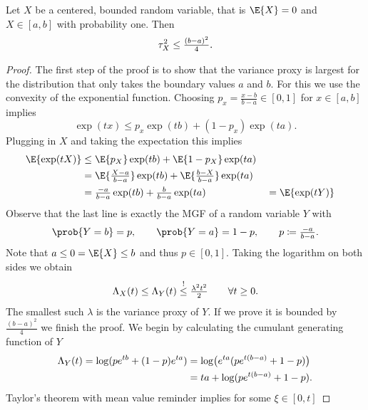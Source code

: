\begin{mdframed}[innertopmargin=0pt]
\begin{lemma}
    \label{lem: hoeffding's lemma}
    Let \(X\) be a centered, bounded random variable, that is 
    \(\E{X}=0\) and \(X\in [a,b]\) with probability one. Then
    \[
        \tau^2_{X} \le \tfrac{(b-a)^2}4.
    \]
\end{lemma}
\end{mdframed}
\begin{proof}
    The first step of the proof is to show that the variance proxy is largest
    for the distribution that only takes the boundary values \(a\) and \(b\).
    For this we use the convexity of the exponential function. 
    Choosing \(p_x=\frac{x-b}{b-a}\in [0,1]\) for \(x\in [a,b]\) implies
    \[
        \exp(t x) \le p_x \exp(t b) + (1-p_x) \exp(t a).
    \]
    Plugging in \(X\) and taking the expectation this implies
    \[\begin{aligned}
        \E{\exp(t X)}
        &\le \E{p_X} \exp(t b) + \E{1-p_X} \exp(t a)
        \\
        &= \E{\tfrac{X-a}{b-a}} \exp(t b) + \E{\tfrac{b-X}{b-a}} \exp(t a)
        \\
        &= \tfrac{-a}{b-a}\exp(t b) + \tfrac{b}{b-a}\exp(t a)
        &&= \E{\exp(t Y)}
    \end{aligned}
    \]
    Observe that the last line is exactly the MGF of a random variable \(Y\)
    with
    \[
        \prob{Y=b} = p,
        \qquad
        \prob{Y=a} = 1-p,
        \qquad p \coloneq \tfrac{-a}{b-a}.
    \]
    Note that \(a\le 0=\E{X} \le b\) and thus \(p\in [0,1]\).
    Taking the logarithm on both sides we obtain
    \begin{equation}
        \label{eq: rademacher are worst offender}
        \Lambda_X(t) \le \Lambda_Y(t) \overset{!}\le \tfrac{\lambda^2 t^2}{2}
        \qquad \forall t\ge 0.
    \end{equation}
    The smallest such \(\lambda\) is the variance proxy of \(Y\).
    If we prove it is bounded by \(\frac{(b-a)^2}{4}\) we finish the proof.
    We begin by calculating the cumulant generating function of \(Y\) 
    \[\begin{aligned}
        \Lambda_Y(t)
        = \log(p e^{t b} + (1-p) e^{t a})
        &= \log\bigl(e^{ta}(p e^{t (b-a)} + 1-p)\bigr)
        \\
        &= ta + \log(pe^{t(b-a)}+1-p).
    \end{aligned}
    \]
    Taylor's theorem with mean value reminder implies for some \(\xi\in [0,t]\)

\end{proof}

